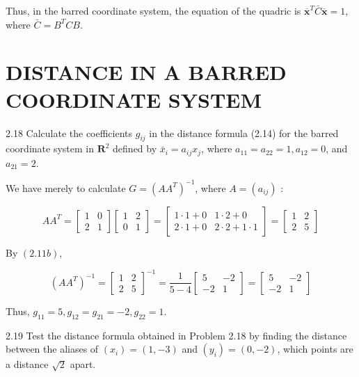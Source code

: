 \documentclass[10pt]{article}
\begin{document}
Thus, in the barred coordinate system, the equation of the quadric is $\overline{\mathbf{x}}^{T} \bar{C} \overline{\mathbf{x}}=1$, where $\bar{C}=B^{T} C B$.

\section*{DISTANCE IN A BARRED COORDINATE SYSTEM}
2.18 Calculate the coefficients $g_{i j}$ in the distance formula (2.14) for the barred coordinate system in $\mathbf{R}^{2}$ defined by $\bar{x}_{i}=a_{i j} x_{j}$, where $a_{11}=a_{22}=1, a_{12}=0$, and $a_{21}=2$.

We have merely to calculate $G=\left(A A^{T}\right)^{-1}$, where $A=\left(a_{i j}\right)$ :

$$
A A^{T}=\left[\begin{array}{ll}
1 & 0 \\
2 & 1
\end{array}\right]\left[\begin{array}{ll}
1 & 2 \\
0 & 1
\end{array}\right]=\left[\begin{array}{cc}
1 \cdot 1+0 & 1 \cdot 2+0 \\
2 \cdot 1+0 & 2 \cdot 2+1 \cdot 1
\end{array}\right]=\left[\begin{array}{ll}
1 & 2 \\
2 & 5
\end{array}\right]
$$

By $(2.11 b)$,

$$
\left(A A^{T}\right)^{-1}=\left[\begin{array}{ll}
1 & 2 \\
2 & 5
\end{array}\right]^{-1}=\frac{1}{5-4}\left[\begin{array}{rr}
5 & -2 \\
-2 & 1
\end{array}\right]=\left[\begin{array}{rr}
5 & -2 \\
-2 & 1
\end{array}\right]
$$

Thus, $g_{11}=5, g_{12}=g_{21}=-2, g_{22}=1$.

2.19 Test the distance formula obtained in Problem 2.18 by finding the distance between the aliases of $\left(x_{i}\right)=(1,-3)$ and $\left(y_{i}\right)=(0,-2)$, which points are a distance $\sqrt{2}$ apart.
\end{document}
